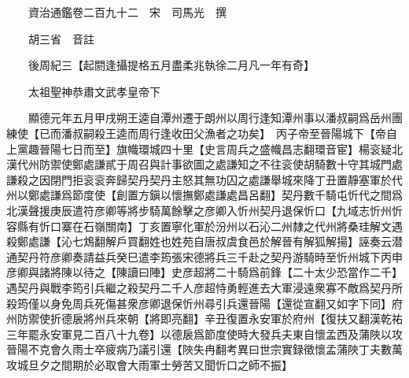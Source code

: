 










 


 
 


 

  
  
  
  
  





  
  
  
  
  
 
  

  

  
  
  



  

 
 

  
   




  

  
  


  　　資治通鑑卷二百九十二　宋　司馬光　撰

　　胡三省　音註

　　後周紀三【起閼逢攝提格五月盡柔兆執徐二月凡一年有奇】

　　太祖聖神恭肅文武孝皇帝下

　　顯德元年五月甲戌朔王逵自潭州遷于朗州以周行逢知潭州事以潘叔嗣爲岳州團練使【已而潘叔嗣殺王逵而周行逢收田父漁者之功矣】　丙子帝至晉陽城下【帝自上黨趣晉陽七日而至】旗幟環城四十里【史言周兵之盛幟昌志翻環音宦】楊衮疑北漢代州防禦使鄭處謙貳于周召與計事欲圖之處謙知之不往衮使胡騎數十守其城門處謙殺之因閉門拒衮衮奔歸契丹契丹主怒其無功囚之處謙舉城來降丁丑置靜塞軍於代州以鄭處謙爲節度使【創置方鎭以懷撫鄭處謙處昌呂翻】契丹數千騎屯忻代之間爲北漢聲援庚辰遣符彦卿等將步騎萬餘擊之彦卿入忻州契丹退保忻口【九域志忻州忻容縣有忻口寨在石嶺關南】丁亥置寧化軍於汾州以石沁二州隸之代州將桑珪解文遇殺鄭處謙【沁七鴆翻解戶買翻姓也姓苑自唐叔虞食邑於解晉有解狐解揚】誣奏云潜通契丹符彦卿奏請益兵癸巳遣李筠張宋德將兵三千赴之契丹游騎時至忻州城下丙申彦卿與諸將陳以待之【陳讀曰陣】史彦超將二十騎爲前鋒【二十太少恐當作二千】遇契丹與戰李筠引兵繼之殺契丹二千人彦超恃勇輕進去大軍浸遠衆寡不敵爲契丹所殺筠僅以身免周兵死傷甚衆彦卿退保忻州尋引兵還晉陽【還從宣翻又如字下同】府州防禦使折德扆將州兵來朝【將即亮翻】辛丑復置永安軍於府州【復扶又翻漢乾祐三年罷永安軍見二百八十九卷】以德扆爲節度使時大發兵夫東自懷孟西及蒲陜以攻晉陽不克會久雨士卒疲病乃議引還【陜失冉翻考異曰世宗實録徵懷孟蒲陜丁夫數萬攻城旦夕之間期於必取會大雨軍士勞苦又聞忻口之師不振】

